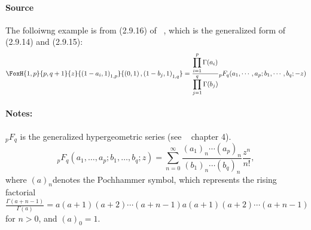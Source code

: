 \paragraph{Source} The folloiwng example is from (2.9.16) of
~\cite{kilbas.saigo:04:h-transforms}, which is the generalized form of (2.9.14) and (2.9.15):
\begin{align*}
  \FoxH
    {1,p}
    {p,q+1}
    {z}
    {\left(1-a_i, 1\right)_{1,p}}
    {\left(0, 1\right), \left(1-b_j, 1\right)_{1,q}}=\frac{\displaystyle\prod_{i=1}^{p}\Gamma(a_i)}{\displaystyle\prod_{j=1}^{q}\Gamma(b_j)}{}_pF_q(a_1,\cdots, a_p;b_1,\cdots, b_q;-z)
\end{align*}
\paragraph{Notes:}
${}_pF_q$ is the generalized hypergeometric series (see ~\cite{erdelyi.magnus.ea:81:higher*1} chapter 4).
$${}_pF_q(a_1, \ldots, a_p; b_1, \ldots, b_q; z) = \sum_{n=0}^{\infty} \frac{(a_1)_n \cdots (a_p)_n}{(b_1)_n \cdots (b_q)_n} \frac{z^n}{n!},$$
where  $(a)_n$denotes the Pochhammer symbol, which represents the rising factorial $\frac{\Gamma{(a+n-1)}}{\Gamma{(a)}} = a(a+1)(a+2)⋯(a+n−1)a(a+1)(a+2)⋯(a+n−1)$ for $n > 0$, and $(a)_0=1$.
